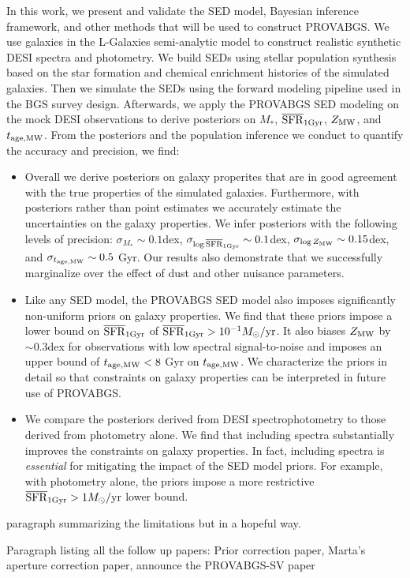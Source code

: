 In this work, we present and validate the SED model, Bayesian inference
framework, and other methods that will be used to construct PROVABGS.
We use  galaxies in the {\sc L-Galaxies} semi-analytic model to
construct realistic synthetic DESI spectra and photometry.  
We build SEDs using stellar population synthesis based on the star formation
and chemical enrichment histories of the simulated galaxies.
Then we simulate the SEDs using the forward modeling pipeline used in the BGS
survey design.  
Afterwards, we apply the PROVABGS SED modeling on the mock DESI observations to
derive posteriors on $M_*$, $\overline{\rm SFR}_{\rm 1Gyr}$, $Z_{\rm MW}$, and $t_{\rm age, MW}$. 
From the posteriors and the population inference we conduct to quantify the
accuracy and precision, we find: 
\begin{itemize}
    \item Overall we derive posteriors on galaxy properites that are in good
        agreement with the true properties of the simulated galaxies. 
        Furthermore, with posteriors rather than point estimates we accurately
        estimate the uncertainties on the galaxy properties. 
        We infer posteriors with the following levels of precision: 
        $\sigma_{M_*}\sim0.1$dex, $\sigma_{\log\overline{\rm SFR}_{\rm 1Gyr}}\sim0.1$dex, 
        $\sigma_{\log Z_{\rm MW}}\sim0.15$dex, and $\sigma_{t_{\rm age, MW}}\sim0.5$ Gyr. 
        Our results also demonstrate that we successfully marginalize over the
        effect of dust and other nuisance parameters. 
    \item Like any SED model, the PROVABGS SED model also imposes significantly
        non-uniform priors on galaxy properties. 
        We find that these priors impose a lower bound on $\overline{\rm SFR}_{\rm 1Gyr}$ of 
        $\overline{\rm SFR}_{\rm 1Gyr} > 10^{-1}M_\odot/{\rm yr}$. 
        It also biases $Z_{\rm MW}$ by ${\sim}0.3$dex for observations with low
        spectral signal-to-noise and imposes an upper bound of $t_{\rm age, MW} < 8$ Gyr
        on $t_{\rm age, MW}$. 
        We characterize the priors in detail so that constraints on galaxy
        properties can be interpreted in future use of PROVABGS. 
    \item We compare the posteriors derived from DESI spectrophotometry to
        those derived from photometry alone. 
        We find that including spectra substantially improves the constraints
        on galaxy properties. 
        In fact, including spectra is {\em essential} for mitigating the impact
        of the SED model priors. 
        For example, with photometry alone, the priors impose a more
        restrictive $\overline{\rm SFR}_{\rm 1Gyr} > 1 M_\odot/{\rm yr}$ lower bound. 
\end{itemize}

paragraph summarizing the limitations but in a hopeful way. 

Paragraph listing all the follow up papers: 
Prior correction paper,
Marta's aperture correction paper,
announce the PROVABGS-SV paper 
